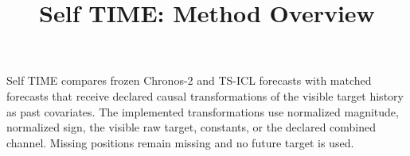 \documentclass{article}
\title{Self TIME: Method Overview}
\author{}
\date{}
\begin{document}
\maketitle
Self TIME compares frozen Chronos-2 and TS-ICL forecasts with matched forecasts
that receive declared causal transformations of the visible target history as
past covariates. The implemented transformations use normalized magnitude,
normalized sign, the visible raw target, constants, or the declared combined
channel. Missing positions remain missing and no future target is used.
\end{document}
